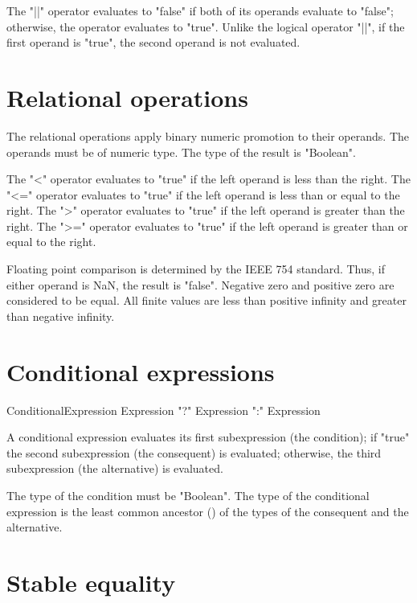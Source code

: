The \xcd"||" operator  evaluates to \xcd"false" if both of its
operands evaluate to \xcd"false"; otherwise, the operator
evaluates to \xcd"true".
Unlike the logical operator \xcd"||",
if the first operand is \xcd"true",
the second operand is not evaluated.

\section{Relational operations} 

The relational operations apply binary numeric promotion
to their operands. The operands must be of numeric type.
The type of the result is \xcd"Boolean".

The \xcd"<" operator evaluates to \xcd"true" if the left operand is
less than the right.
The \xcd"<=" operator evaluates to \xcd"true" if the left operand is
less than or equal to the right.
The \xcd">" operator evaluates to \xcd"true" if the left operand is
greater than the right.
The \xcd">=" operator evaluates to \xcd"true" if the left operand is
greater than or equal to the right.

Floating point comparison is determined by the IEEE 754
standard.  Thus,
if either operand is NaN, the result is \xcd"false".
Negative zero and positive zero are considered to be equal.
All finite values are less than positive infinity and greater
than negative infinity.

\section{Conditional expressions}
\label{Conditional}

\begin{grammar}
ConditionalExpression \: Expression
                \xcd"?" Expression
                \xcd":" Expression \\
\end{grammar}

A conditional expression evaluates its first subexpression (the
condition); if \xcd"true"
the second subexpression (the consequent) is evaluated; otherwise,
the third subexpression (the alternative) is evaluated.

The type of the condition must be \xcd"Boolean".
The type of the conditional expression is the least common
ancestor () of the types of the consequent and the alternative.

\section{Stable equality}
\label{StableEquality}
\index{==}\index{!=}

